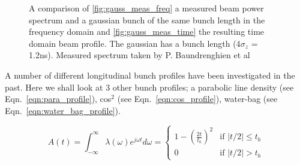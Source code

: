 \begin{figure}
\caption{A comparison of \ref{fig:gauss_meas_freq} a measured beam power spectrum and a gaussian bunch of the same bunch length in the frequency domain and \ref{fig:gauss_meas_time} the resulting time domain beam profile. The gaussian has a bunch length (4$\sigma_{z}$ = 1.2ns). Measured spectrum taken by P. Baundrenghien et al \cite{Baudrenghien:LHCPowSpec}}
\label{fig:measured_gauss}
\end{figure}

A number of different longitudinal bunch profiles have been investigated in the past. Here we shall look at 3 other bunch profiles; a parabolic line density (see Eqn.~\ref{eqn:para_profile}), cos$^{2}$ (see Eqn.~\ref{eqn:cos_profile}), water-bag (see Eqn.~\ref{eqn:water_bag_profile}).

\begin{equation}
A\left( t \right) = \int^{\infty}_{-\infty} \lambda \left( \omega \right) e^{j\omega t} d\omega = 
\begin{cases}1-\left( \frac{2t} {t_{b}} \right)^{2} &\textrm{if $| t/2 | \leq t_{b}$}\\
0								&\textrm{if $| t/2 | > t_{b}$}
\end{cases}
\label{eqn:para_profile}
\end{equation}

